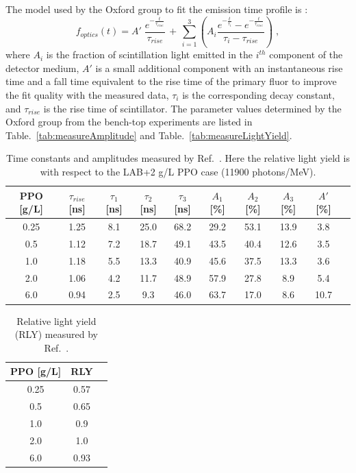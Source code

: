 The model used by the Oxford group to fit the emission time profile is \cite{oxfordMeasurement}: 
\begin{equation}
f_{optics}(t)= A' \; \frac{e^{-\frac{t}{\tau_{rise}}}}{\tau_{rise}} \, + \, \sum_{i=1}^3 (A_i\frac{e^{-\frac{t}{\tau_i}}-e^{-\frac{t}{\tau_{rise}}}}{\tau_i-\tau_{rise}}) \; ,
\end{equation}
where $A_i$ is the fraction of scintillation light emitted in the $i^{th}$ component of the detector medium, $A'$ is a small additional component with an instantaneous rise time and a
fall time equivalent to the rise time of the primary fluor to improve the fit quality with the measured data, $\tau_i$ is the corresponding decay constant, and $\tau_{rise}$ is the rise time of scintillator. The parameter values determined by the Oxford group from the bench-top experiments are listed in Table.~\ref{tab:measureAmplitude} and Table.~\ref{tab:measureLightYield}.

\begin{table}[ht]
	\centering\label{tab:measureAmplitude}
	\caption{\label{oxfordMeasure} Time constants and amplitudes measured by Ref.~\cite{oxfordMeasurement}. Here the relative light yield is with respect to the LAB+2 g/L PPO case (11900 photons/MeV).}	
	{\centering
		\begin{tabular*}{160mm}{c@{\extracolsep{\fill}}ccccccccc}
			\toprule 
			PPO [g/L] & $\tau_{rise}$ [ns] & $\tau_1$ [ns] & $\tau_2$ [ns] & $\tau_3$ [ns] & $A_1$ [\%]  & $A_2$ [\%]   & $A_3$ [\%]  & $A'$ [\%] \\
			\midrule
			0.25 & 1.25 & 8.1 & 25.0 & 68.2 & 29.2 & 53.1 & 13.9 & 3.8\\
			0.5  & 1.12 & 7.2 & 18.7 & 49.1 & 43.5 & 40.4 & 12.6 & 3.5 \\
			1.0 & 1.18 & 5.5 & 13.3 & 40.9 & 45.6 & 37.5 & 13.3 & 3.6 \\
			2.0 & 1.06 & 4.2 & 11.7 & 48.9 & 57.9 & 27.8 & 8.9 & 5.4	\\
			6.0 & 0.94 & 2.5 & 9.3  & 46.0 & 63.7 & 17.0 & 8.6 & 10.7\\
			\bottomrule	
		\end{tabular*}
	}
\end{table}

\begin{table}[ht]
	\centering\label{tab:measureLightYield}
	\caption{\label{oxfordMeasure2}Relative light yield (RLY) measured by Ref.~\cite{oxfordMeasurement}.}	
	{\centering
		\begin{tabular*}{60mm}{c@{\extracolsep{\fill}}cc}
			\toprule 
			PPO [g/L] & RLY \\
			\midrule
			0.25 & 0.57\\
			0.5 & 0.65\\
			1.0 & 0.9\\
			2.0 & 1.0\\
			6.0 & 0.93\\
			\bottomrule	
		\end{tabular*}
	}
\end{table}

